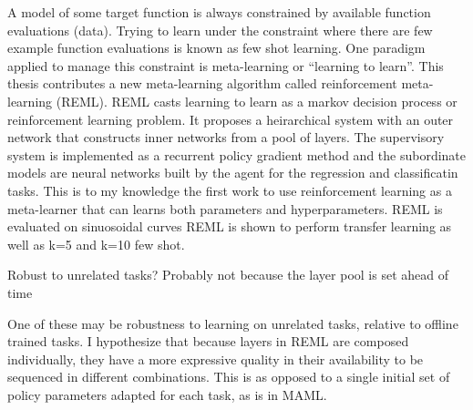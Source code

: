 A model of some target function is always constrained by available function
evaluations (data). Trying to learn under the constraint where there are few
example function evaluations is known as few shot learning. One paradigm applied
to manage this constraint is meta-learning or ``learning to learn''. This thesis
contributes a new meta-learning algorithm called reinforcement meta-learning
(REML). REML casts learning to learn as a markov decision process or
reinforcement learning problem. It proposes a heirarchical system with an outer
network that constructs inner networks from a pool of layers. The supervisory system 
is implemented as a recurrent policy gradient method and the subordinate models are 
neural networks built by the agent for the regression and classificatin tasks. 
This is to my knowledge the first work to use reinforcement learning as a meta-learner
that can learns both parameters and hyperparameters. REML is evaluated on sinuosoidal 
curves 
REML is shown to perform transfer 
learning as well as k=5 and k=10 few shot.

Robust to unrelated tasks? Probably not because the layer pool is set ahead of time

One of these may be robustness to learning on unrelated
tasks, relative to offline trained tasks. I hypothesize that because layers in
REML are composed individually, they have a more expressive quality in their
availability to be sequenced in different combinations. This is as opposed to a
single initial set of policy parameters adapted for each task, as is in MAML.
